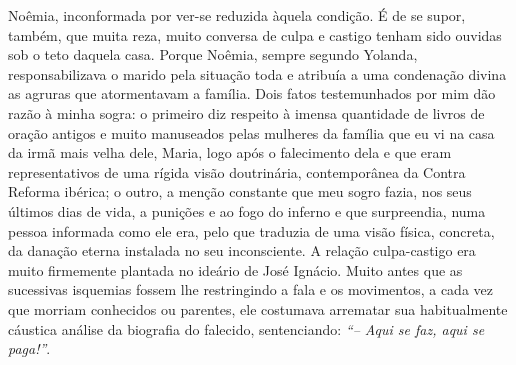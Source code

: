 Noêmia, inconformada por ver-se reduzida àquela condição.
É de se supor, também, que muita reza, muito conversa de culpa e castigo tenham sido ouvidas sob o teto daquela casa.
Porque Noêmia, sempre segundo Yolanda, responsabilizava o marido pela situação toda e atribuía a uma condenação divina as agruras que atormentavam a família.
Dois fatos testemunhados por mim dão razão à minha sogra: o primeiro diz respeito à imensa quantidade de livros de oração antigos e muito manuseados pelas mulheres da família que eu vi na casa da irmã mais velha dele, Maria, logo após o falecimento dela e que eram representativos de uma rígida visão doutrinária, contemporânea da Contra Reforma ibérica; o outro, a menção constante que meu sogro fazia, nos seus últimos dias de vida, a punições e ao fogo do inferno e que surpreendia, numa pessoa informada como ele era, pelo que traduzia de uma visão física, concreta, da danação eterna instalada no seu inconsciente.
A relação culpa-castigo era muito firmemente plantada no ideário de José Ignácio.
Muito antes que as sucessivas isquemias fossem lhe restringindo a fala e os movimentos, a cada vez que morriam conhecidos ou parentes, ele costumava arrematar sua habitualmente cáustica análise da biografia do falecido, sentenciando: 
\textit{``-- Aqui se faz, aqui se paga!''}.

